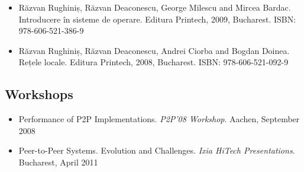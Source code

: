 \begin{itemize}
  \item Răzvan Rughiniș, Răzvan Deaconescu, George Milescu and Mircea Bardac.
  Introducere în sisteme de operare. Editura Printech, 2009, Bucharest. ISBN:
  978-606-521-386-9
  \item Răzvan Rughiniș, Răzvan Deaconescu, Andrei Ciorba and Bogdan Doinea.
  Rețele locale. Editura Printech, 2008, Bucharest. ISBN: 978-606-521-092-9
\end{itemize}

\subsection{Workshops}

\begin{itemize}
  \item Performance of P2P Implementations. \textit{P2P'08 Workshop}. Aachen,
  September 2008
  \item Peer-to-Peer Systems. Evolution and Challenges. \textit{Ixia HiTech
  Presentations}. Bucharest, April 2011
\end{itemize}
